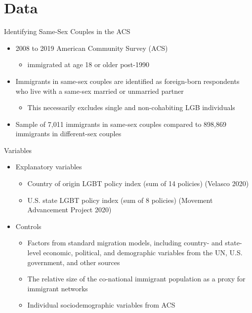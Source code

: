 \documentclass[
  ignorenonframetext,
]{beamer}
\providecommand{\tightlist}{%
  \setlength{\itemsep}{0pt}\setlength{\parskip}{0pt}}
\begin{document}
\hypertarget{data}{%
\section{Data}\label{data}}

\begin{frame}{Identifying Same-Sex Couples in the ACS}
\protect\hypertarget{identifying-same-sex-couples-in-the-acs}{}
\begin{itemize}
\tightlist
\item
  2008 to 2019 American Community Survey (ACS)

  \begin{itemize}
  \tightlist
  \item
    immigrated at age 18 or older post-1990
  \end{itemize}
\item
  Immigrants in same-sex couples are identified as foreign-born
  respondents who live with a same-sex married or unmarried partner

  \begin{itemize}
  \tightlist
  \item
    This necessarily excludes single and non-cohabiting LGB individuals
  \end{itemize}
\item
  Sample of 7,011 immigrants in same-sex couples compared to 898,869
  immigrants in different-sex couples
\end{itemize}
\end{frame}

\begin{frame}{Variables}
\protect\hypertarget{variables}{}
\begin{itemize}
\tightlist
\item
  Explanatory variables

  \begin{itemize}
  \tightlist
  \item
    Country of origin LGBT policy index (sum of 14 policies) (Velasco
    2020)
  \item
    U.S. state LGBT policy index (sum of 8 policies) (Movement
    Advancement Project 2020)
  \end{itemize}
\item
  Controls

  \begin{itemize}
  \tightlist
  \item
    Factors from standard migration models, including country- and
    state-level economic, political, and demographic variables from the
    UN, U.S. government, and other sources
  \item
    The relative size of the co-national immigrant population as a proxy
    for immigrant networks
  \item
    Individual sociodemographic variables from ACS
  \end{itemize}
\end{itemize}
\end{frame}
\end{document}
